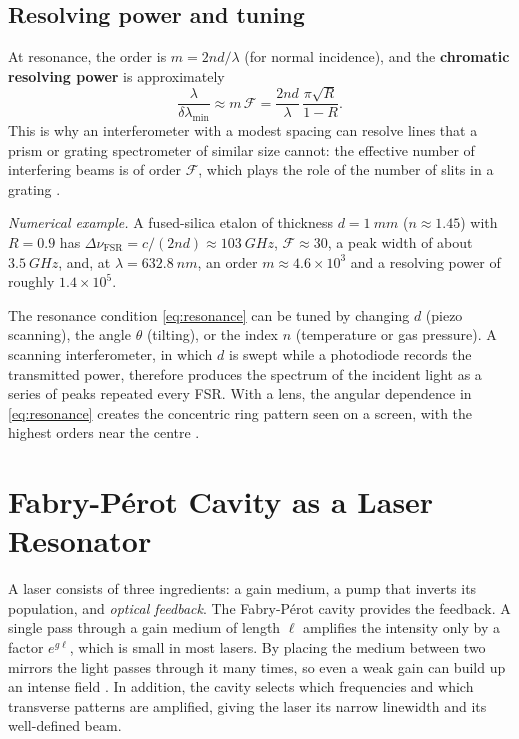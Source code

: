 \documentclass[11pt,a4paper]{article}
\newcommand{\FP}{Fabry-P\'erot}
\newcommand{\FSR}{\Delta\nu_{\mathrm{FSR}}}
\newcommand{\Fin}{\mathcal{F}}
\begin{document}
	\subsection{Resolving power and tuning}
	
	At resonance, the order is $m=2nd/\lambda$ (for normal incidence), and the \textbf{chromatic resolving power} is approximately
	\begin{equation}
		\frac{\lambda}{\delta\lambda_{\min}} \approx m\,\Fin = \frac{2nd}{\lambda}\,\frac{\pi\sqrt R}{1-R}.
	\end{equation}
	This is why an interferometer with a modest spacing can resolve lines that a prism or grating spectrometer of similar size cannot: the effective number of interfering beams is of order $\Fin$, which plays the role of the number of slits in a grating \cite{Vaughan,Hernandez}.
	
	\emph{Numerical example.} A fused-silica etalon of thickness $d=\SI{1}{mm}$ ($n\approx1.45$) with $R=0.9$ has $\FSR=c/(2nd)\approx\SI{103}{GHz}$, $\Fin\approx30$, a peak width of about $\SI{3.5}{GHz}$, and, at $\lambda=\SI{632.8}{nm}$, an order $m\approx4.6\times10^{3}$ and a resolving power of roughly $1.4\times10^{5}$.
	
	The resonance condition \eqref{eq:resonance} can be tuned by changing $d$ (piezo scanning), the angle $\theta$ (tilting), or the index $n$ (temperature or gas pressure). A scanning interferometer, in which $d$ is swept while a photodiode records the transmitted power, therefore produces the spectrum of the incident light as a series of peaks repeated every FSR. With a lens, the angular dependence in \eqref{eq:resonance} creates the concentric ring pattern seen on a screen, with the highest orders near the centre \cite{Hecht}.
	
	\section{\FP{} Cavity as a Laser Resonator}
	
	A laser consists of three ingredients: a gain medium, a pump that inverts its population, and \emph{optical feedback}. The \FP{} cavity provides the feedback. A single pass through a gain medium of length $\ell$ amplifies the intensity only by a factor $e^{g\ell}$, which is small in most lasers. By placing the medium between two mirrors the light passes through it many times, so even a weak gain can build up an intense field \cite{Siegman,Svelto,Milonni}. In addition, the cavity selects which frequencies and which transverse patterns are amplified, giving the laser its narrow linewidth and its well-defined beam.
	
\end{document}
